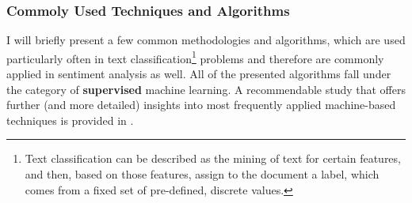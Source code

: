
\subsubsection{Commoly Used Techniques and Algorithms}
\label{sssec: lit_rev_mining_algos}

I will briefly present a few common methodologies and algorithms, which are used particularly often in text classification\footnote{Text classification can be described as the mining of text for certain features, and then, based on those features, assign to the document a label, which comes from a fixed set of pre-defined, discrete values.} problems and therefore are commonly applied in sentiment analysis as well. All of the presented algorithms fall under the category of \textbf{supervised} machine learning. A recommendable study that offers further (and more detailed) insights into most frequently applied machine-based techniques is provided in \textcite{GuoShiTu2017}. 


